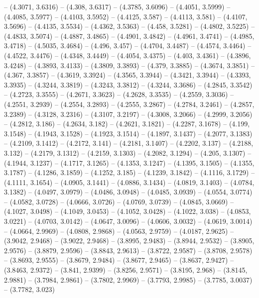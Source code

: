 {  -- (4.3071, 3.6316) -- (4.308, 3.6317) -- (4.3785, 3.6096) -- (4.4051, 3.5999)
   -- (4.4085, 3.5977) -- (4.4103, 3.5952) -- (4.4125, 3.587) -- (4.4113, 3.581)
   -- (4.4107, 3.5696) -- (4.4135, 3.5534) -- (4.4362, 3.5363) -- (4.458, 
  3.5281) -- (4.4802, 3.5225) -- (4.4833, 3.5074) -- (4.4887, 3.4865) -- 
  (4.4901, 3.4842) -- (4.4961, 3.4741) -- (4.4985, 3.4718) -- (4.5035, 3.4684) 
  -- (4.496, 3.457) -- (4.4704, 3.4487) -- (4.4574, 3.4464) -- (4.4522, 3.4476) 
  -- (4.4348, 3.4449) -- (4.4054, 3.4375) -- (4.403, 3.4361) -- (4.3896, 3.4248)
   -- (4.3893, 3.4133) -- (4.3809, 3.3893) -- (4.379, 3.3885) -- (4.3674, 
  3.3851) -- (4.367, 3.3857) -- (4.3619, 3.3924) -- (4.3565, 3.3944) -- (4.3421,
   3.3944) -- (4.3393, 3.3935) -- (4.3244, 3.3819) -- (4.3243, 3.3812) -- 
  (4.3244, 3.3686) -- (4.2845, 3.3542) -- (4.2723, 3.3555) -- (4.2671, 3.3623) 
  -- (4.2628, 3.3535) -- (4.2559, 3.3036) -- (4.2551, 3.2939) -- (4.2554, 
  3.2893) -- (4.2555, 3.2867) -- (4.2784, 3.2461) -- (4.2857, 3.2389) -- 
  (4.3128, 3.2316) -- (4.3107, 3.2197) -- (4.3008, 3.2066) -- (4.2999, 3.2056) 
  -- (4.2812, 3.186) -- (4.2634, 3.182) -- (4.2621, 3.1821) -- (4.2287, 3.1678) 
  -- (4.199, 3.1548) -- (4.1943, 3.1528) -- (4.1923, 3.1514) -- (4.1897, 3.1437)
   -- (4.2077, 3.1383) -- (4.2109, 3.1412) -- (4.2172, 3.141) -- (4.2181, 
  3.1407) -- (4.2202, 3.137) -- (4.2188, 3.132) -- (4.2179, 3.1312) -- (4.2159, 
  3.1303) -- (4.2082, 3.1294) -- (4.205, 3.1307) -- (4.1944, 3.1237) -- (4.1717,
   3.1265) -- (4.1353, 3.1247) -- (4.1395, 3.1505) -- (4.1355, 3.1787) -- 
  (4.1286, 3.1859) -- (4.1252, 3.185) -- (4.1239, 3.1842) -- (4.1116, 3.1729) --
   (4.1111, 3.1654) -- (4.0905, 3.1441) -- (4.0886, 3.1434) -- (4.0819, 3.1403) 
  -- (4.0784, 3.1382) -- (4.0497, 3.0979) -- (4.0486, 3.0948) -- (4.0485, 
  3.0939) -- (4.0554, 3.0774) -- (4.0582, 3.0728) -- (4.0666, 3.0726) -- 
  (4.0769, 3.0739) -- (4.0845, 3.0669) -- (4.1027, 3.0498) -- (4.1049, 3.0453) 
  -- (4.1052, 3.0428) -- (4.1022, 3.038) -- (4.0853, 3.0221) -- (4.0703, 3.0142)
   -- (4.0647, 3.0096) -- (4.0606, 3.0032) -- (4.0619, 3.0014) -- (4.0664, 
  2.9969) -- (4.0808, 2.9868) -- (4.0563, 2.9759) -- (4.0187, 2.9625) -- 
  (3.9042, 2.9468) -- (3.9022, 2.9468) -- (3.8995, 2.9483) -- (3.8944, 2.9532) 
  -- (3.8905, 2.9576) -- (3.8879, 2.9596) -- (3.8843, 2.9613) -- (3.8722, 
  2.9587) -- (3.8708, 2.9578) -- (3.8693, 2.9555) -- (3.8679, 2.9484) -- 
  (3.8677, 2.9465) -- (3.8637, 2.9427) -- (3.8463, 2.9372) -- (3.841, 2.9399) --
   (3.8256, 2.9571) -- (3.8195, 2.968) -- (3.8145, 2.9881) -- (3.7984, 2.9861) 
  -- (3.7802, 2.9969) -- (3.7793, 2.9985) -- (3.7785, 3.0037) -- (3.7782, 3.023)
}

